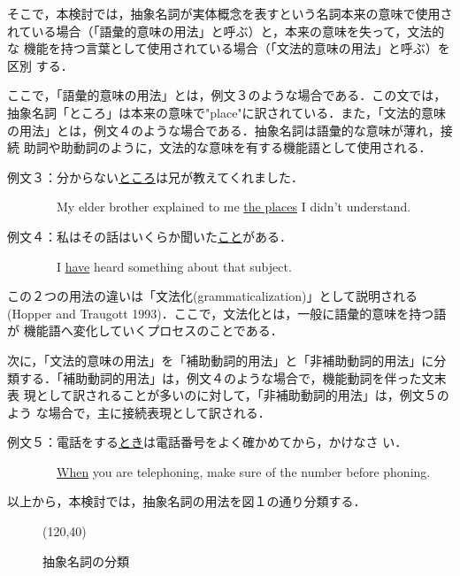 そこで，本検討では，抽象名詞が実体概念を表すという名詞本来の意味で使用さ
れている場合（「語彙的意味の用法」と呼ぶ）と，本来の意味を失って，文法的な
機能を持つ言葉として使用されている場合（「文法的意味の用法」と呼ぶ）を区別
する．

ここで，「語彙的意味の用法」とは，例文３のような場合である．この文では，
抽象名詞「ところ」は本来の意味で"place"に訳されている．また，「文法的意味
の用法」とは，例文４のような場合である．抽象名詞は語彙的な意味が薄れ，接続
助詞や助動詞のように，文法的な意味を有する機能語として使用される．

\vspace{6pt}

例文３：分からない\underline{ところ}は兄が教えてくれました．

　　　　My elder brother explained to me \underline{the places} I didn't
understand.

例文４：私はその話はいくらか聞いた\underline{こと}がある．

　　　　I \underline{have} heard something about that subject.

\vspace{6pt}

この２つの用法の違いは「文法化(grammaticalization)」として説明される
(Hopper and Traugott 1993)．ここで，文法化とは，一般に語彙的意味を持つ語が
機能語へ変化していくプロセスのことである．

次に，「文法的意味の用法」を「補助動詞的用法」と「非補助動詞的用法」に分
類する．「補助動詞的用法」は，例文４のような場合で，機能動詞を伴った文末表
現として訳されることが多いのに対して，「非補助動詞的用法」は，例文５のよう
な場合で，主に接続表現として訳される．

\vspace{6pt}

例文５：電話をする\underline{とき}は電話番号をよく確かめてから，かけなさ
い．

　　　　\underline{When} you are telephoning, make sure of the number before
phoning.

\vspace{6pt}

以上から，本検討では，抽象名詞の用法を図１の通り分類する．

\begin{figure}
\begin{center}
\atari(120,40)
\caption{抽象名詞の分類}
\end{center}
\end{figure}



